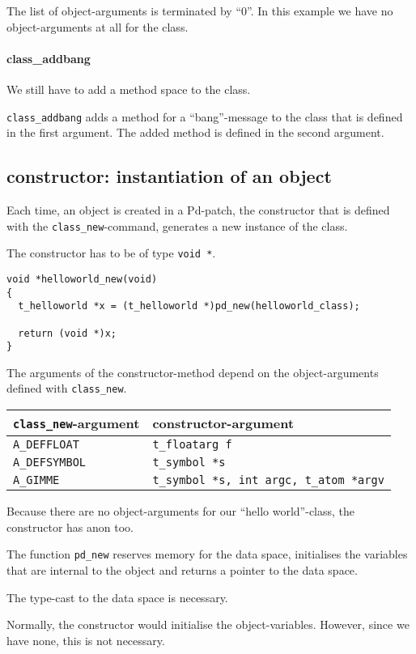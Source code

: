 \documentclass[12pt, a4paper,english,titlepage]{article}
\begin{document}
The list of object-arguments is terminated by ``0''.
In this example we have no object-arguments at all for the class.

\paragraph{class\_addbang}
We still have to add a method space to the class.

\verb+class_addbang+ adds a method for a ``bang''-message to the class that is
defined in the first argument.
The added method is defined in the second argument.


\subsection{constructor: instantiation of an object}
Each time, an object is created in a Pd-patch, the
constructor that is defined with the \verb+class_new+-command,
generates a new instance of the class.

The constructor has to be of type \verb+void *+.

\begin{verbatim}
void *helloworld_new(void)
{
  t_helloworld *x = (t_helloworld *)pd_new(helloworld_class);

  return (void *)x;
}
\end{verbatim}


The arguments of the constructor-method depend on the object-arguments
defined with \verb+class_new+.

\begin{tabular}{l|l}
\verb+class_new+-argument&constructor-argument\\
\hline
\verb+A_DEFFLOAT+&\verb+t_floatarg f+ \\
\verb+A_DEFSYMBOL+&\verb+t_symbol *s+ \\
\verb+A_GIMME+&\verb+t_symbol *s, int argc, t_atom *argv+
\end{tabular}

Because there are no object-arguments for our ``hello world''-class,
the constructor has anon too.

The function \verb+pd_new+ reserves memory for the data space,
initialises the variables that are internal to the object and
returns a pointer to the data space.

The type-cast to the data space is necessary.

Normally, the constructor would initialise the object-variables.
However, since we have none, this is not necessary.
\end{document}

